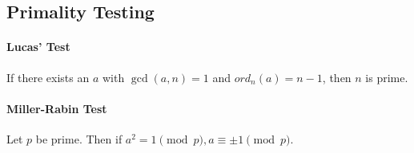 \subsection{Primality Testing}
\paragraph{Lucas' Test}
If there exists an \(a\) with \(\gcd(a, n) = 1\) and \(ord_n(a) = n - 1\), then \(n\) is prime.

\paragraph{Miller-Rabin Test}
Let \(p\) be prime. Then if \(a^2 = 1 \pmod p, a \equiv \pm 1 \pmod p\).